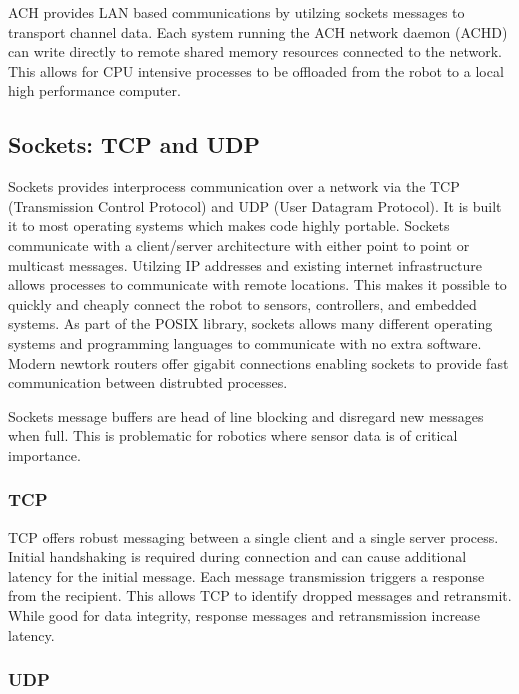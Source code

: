 ACH provides LAN based communications by utilzing sockets messages to transport channel data. Each system running the ACH network daemon (ACHD) can write directly to remote shared memory resources connected to the network\cite{ACHHUBO}. This allows for CPU intensive processes to be offloaded from the robot to a local high performance computer. 

\subsection{Sockets: TCP and UDP}

Sockets provides interprocess communication over a network via the TCP (Transmission Control Protocol) and UDP (User Datagram Protocol). It is built it to most operating systems which makes code highly portable. Sockets communicate with a client/server architecture with either point to point or multicast messages\cite{UDPMULTICAST}. Utilzing IP addresses and existing internet infrastructure allows processes to communicate with remote locations. This makes it possible to quickly and cheaply connect the robot to sensors, controllers, and embedded systems. As part of the POSIX library, sockets allows many different operating systems and programming languages to communicate with no extra software. Modern newtork routers offer gigabit connections enabling sockets to provide fast communication between distrubted processes.

Sockets message buffers are head of line blocking and disregard new messages when full. This is problematic for robotics where sensor data is of critical importance. 

\subsubsection{TCP}

TCP offers robust messaging between a single client and a single server process. Initial handshaking is required during connection and can cause additional latency for the initial message\cite{UDPTCP}. Each message transmission triggers a response from the recipient. This allows TCP to identify dropped messages and retransmit. While good for data integrity, response messages and retransmission increase latency. 

\subsubsection{UDP}

